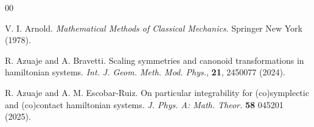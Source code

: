 \documentclass[10pt]{amsart}
\numberwithin{equation}{section}
\newcommand{\tbf}{\textbf}
\theoremstyle{definition}
\begin{document}
\begin{thebibliography}{00} %



 V. I. Arnold. \textit{Mathematical Methods of Classical Mechanics}. Springer New York (1978).



 R. Azuaje and A. Bravetti. Scaling symmetries and canonoid transformations in hamiltonian systems. \textit{Int.
J. Geom. Meth. Mod. Phys.}, \tbf{21}, 2450077  (2024).

 R. Azuaje and A. M. Escobar-Ruiz. On particular integrability for (co)symplectic and (co)contact hamiltonian systems. \textit{J. Phys. A: Math. Theor.} \textbf{58} 045201  (2025).







\end{thebibliography}
\end{document}
